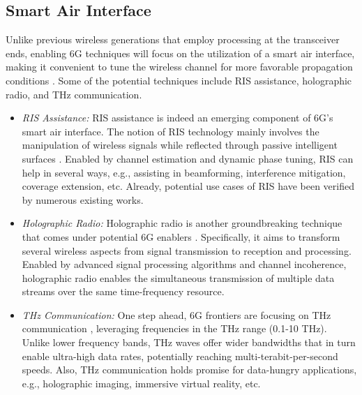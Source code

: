 \documentclass[journal, comsoc]{IEEEtran}
\begin{document}
\subsection{Smart Air Interface} 
Unlike previous wireless generations that employ processing at the transceiver ends, enabling 6G techniques will focus on the utilization of a smart air interface, making it convenient to tune the wireless channel for more favorable propagation conditions \cite{Marco}. Some of the potential techniques include RIS assistance, holographic radio, and THz communication. 

\begin{itemize}
    \item \textit{RIS Assistance:} RIS assistance is indeed an emerging component of 6G's smart air interface. The notion of RIS technology mainly involves the manipulation of wireless signals while reflected through passive intelligent surfaces \cite{rohit}. Enabled by channel estimation and dynamic phase tuning, RIS can help in several ways, e.g., assisting in beamforming, interference mitigation, coverage extension, etc. Already, potential use cases of RIS have been verified by numerous existing works.

\item \textit{Holographic Radio:} Holographic radio is another groundbreaking technique that comes under potential 6G enablers \cite{holo}. Specifically, it aims to transform several wireless aspects from signal transmission to reception and processing. Enabled by advanced signal processing algorithms and channel incoherence, holographic radio enables the simultaneous transmission of multiple data streams over the same time-frequency resource. 

\item \textit{THz Communication:} One step ahead, 6G frontiers are focusing on THz communication \cite{tera}, leveraging frequencies in the THz range (0.1-10 THz). Unlike lower frequency bands, THz waves offer wider bandwidths that in turn enable ultra-high data rates, potentially reaching multi-terabit-per-second speeds. Also, THz communication holds promise for data-hungry applications, e.g.,  holographic imaging, immersive virtual reality, etc.
\end{itemize}
\end{document}
